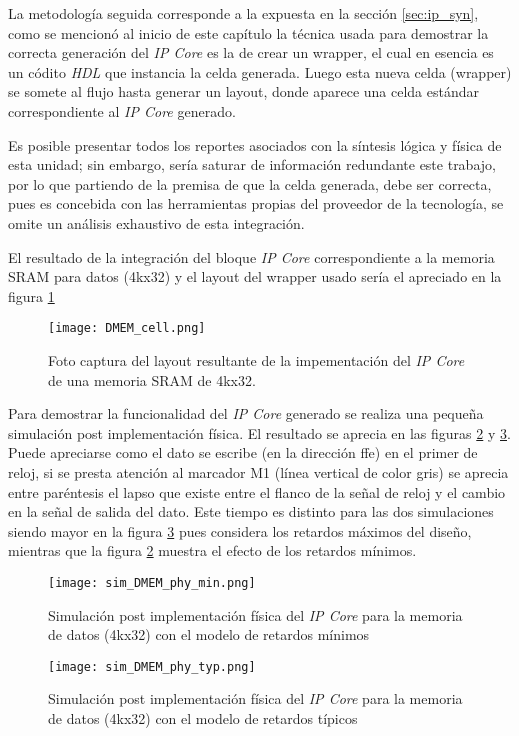 La metodología seguida corresponde a la expuesta en la sección \ref{sec:ip_syn}, como se mencionó al inicio de este capítulo la técnica usada para demostrar la correcta generación del \textit{IP Core} es la de crear un wrapper, el cual en esencia es un códito \textit{HDL} que instancia la celda generada. Luego esta nueva celda (wrapper) se somete al flujo hasta generar un layout, donde aparece una celda estándar correspondiente al \textit{IP Core} generado.

Es posible presentar todos los reportes asociados con la síntesis lógica y física de esta unidad; sin embargo, sería saturar de información redundante este trabajo, por lo que partiendo de la premisa de que la celda generada, debe ser correcta, pues es concebida con las herramientas propias del proveedor de la tecnología, se omite un análisis exhaustivo de esta integración.

El resultado de la integración del bloque \textit{IP Core} correspondiente a la memoria SRAM para datos (4kx32) y el layout del wrapper usado sería el apreciado en la figura \ref{fig:dram_cell}

\begin{figure}[h]
\texttt{[image: DMEM\_cell.png]}
\centering
\caption{Foto captura del layout resultante de la impementación del \textit{IP Core} de una memoria SRAM de 4kx32.}
\label{fig:dram_cell}
\end{figure}

Para demostrar la funcionalidad del \textit{IP Core} generado se realiza una pequeña simulación post implementación física. El resultado se aprecia en las figuras \ref{fig:dram_sim_m} y \ref{fig:dram_sim_t}. Puede apreciarse como el dato se escribe (en la dirección ffe) en el primer de reloj, si se presta atención al marcador M1 (línea vertical de color gris) se aprecia entre paréntesis el lapso que existe entre el flanco de la señal de reloj y el cambio en la señal de salida del dato. Este tiempo es distinto para las dos simulaciones siendo mayor en la figura \ref{fig:dram_sim_t} pues considera los retardos máximos del diseño, mientras que la figura \ref{fig:dram_sim_m} muestra el efecto de los retardos mínimos.

\begin{figure}[h]
\texttt{[image: sim\_DMEM\_phy\_min.png]}
\centering
\caption{Simulación post implementación física del \textit{IP Core} para la memoria de datos (4kx32) con el modelo de retardos mínimos}
\label{fig:dram_sim_m}
\end{figure}

\begin{figure}[h]
\texttt{[image: sim\_DMEM\_phy\_typ.png]}
\centering
\caption{Simulación post implementación física del \textit{IP Core} para la memoria de datos (4kx32) con el modelo de retardos típicos}
\label{fig:dram_sim_t}
\end{figure}